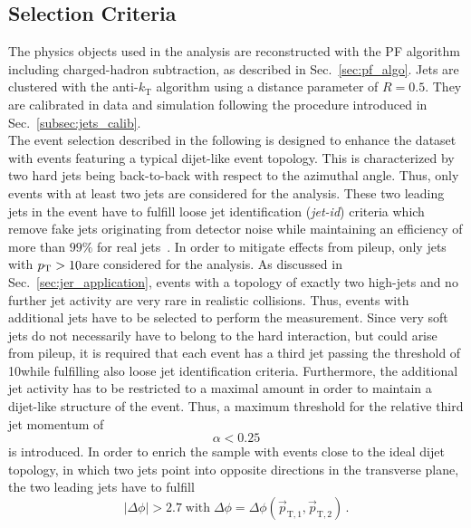 \subsection{Selection Criteria}
\label{subsec:jer_sel_cuts}
The physics objects used in the analysis are reconstructed with the PF algorithm including charged-hadron subtraction, as described in Sec.~\ref{sec:pf_algo}. Jets are clustered with the anti-$k_\mathrm{T}$ algorithm using a distance parameter of $R=0.5$. They are calibrated in data and simulation following the procedure introduced in Sec.~\ref{subsec:jets_calib}.  \\
The event selection described in the following is designed to enhance the dataset with events featuring a typical dijet-like event topology. This is characterized by two hard jets being back-to-back with respect to the azimuthal angle. Thus, only events with at least two jets are considered for the analysis. These two leading jets in the event have to fulfill loose jet identification (\textit{jet-id}) criteria which remove fake jets originating from detector noise while maintaining an efficiency of more than $99\%$ for real jets~\cite{CMS-PAS-JME-09-008, CMS-PAS-JME-10-003}. In order to mitigate effects from pileup, only jets with $p_{\text{T}} > 10$\gev are considered for the analysis. As discussed in Sec.~\ref{sec:jer_application}, events with a topology of exactly two high-\pt jets and no further jet activity are very rare in realistic collisions. Thus, events with additional jets have to be selected to perform the measurement. Since very soft jets do not necessarily have to belong to the hard interaction, but could arise from pileup, it is required that each event has a third jet passing the \pt threshold of 10\gev while fulfilling also loose jet identification criteria. Furthermore, the additional jet activity has to be restricted to a maximal amount in order to maintain a dijet-like structure of the event. Thus, a maximum threshold for the relative third jet momentum of 
\begin{equation*}
\alpha < 0.25 
\end{equation*}
is introduced. In order to enrich the sample with events close to the ideal dijet topology, in which two jets point into opposite directions in the transverse plane, the two leading jets have to fulfill 
\begin{equation}
|\Delta \phi| > 2.7 \; \mathrm{with} \; \Delta \phi = \Delta \phi(\vec{p}_\mathrm{T,1}, \vec{p}_\mathrm{T,2}) \, .
\end{equation}  
